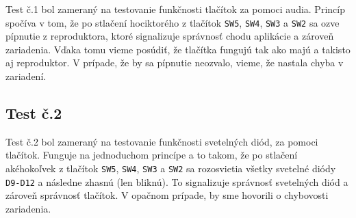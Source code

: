 \documentclass[11pt,a4paper]{article}
\begin{document}
        \indent \hypertarget{label}{Test č.1} bol zameraný na testovanie funkčnosti tlačítok za pomoci audia. Princíp spočíva v tom, že po stlačení hociktorého z tlačítok \texttt{SW5}, \texttt{SW4}, \texttt{SW3} a \texttt{SW2} sa ozve pípnutie z reproduktora, ktoré signalizuje správnosť chodu aplikácie a zároveň zariadenia. Vďaka tomu vieme posúdiť, že tlačítka fungujú tak ako majú a takisto aj reproduktor. V prípade, že by sa pípnutie neozvalo, vieme, že nastala chyba v zariadení.
        
    \subsection{Test č.2}
    
        \indent \hypertarget{label}{Test č.2} bol zameraný na testovanie funkčnosti svetelných diód, za pomoci tlačítok. Funguje na jednoduchom princípe a to takom, že po stlačení akéhokoľvek z tlačítok \texttt{SW5}, \texttt{SW4}, \texttt{SW3} a \texttt{SW2} sa rozosvietia všetky svetelné diódy \texttt{D9-D12} a následne zhasnú (len bliknú). To signalizuje správnosť svetelných diód a zároveň správnosť tlačítok. V opačnom prípade, by sme hovorili o chybovosti zariadenia.
        
\end{document}
